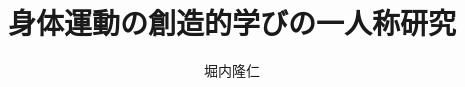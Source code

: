 \documentclass[a4paper,11pt]{jsreport}
\begin{document}
\tableofcontents

\title{身体運動の創造的学びの一人称研究}
\author{堀内隆仁}
\maketitle

% 

% 
















% 
% 


\end{document}

